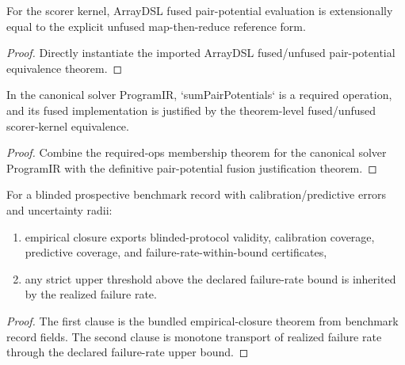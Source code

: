 \begin{theorem}
\label{thm:definitive-pair-potential-fusion-justified}
For the scorer kernel, ArrayDSL fused pair-potential evaluation is extensionally equal to the explicit unfused map-then-reduce reference form.
\end{theorem}

\begin{proof}
Directly instantiate the imported ArrayDSL fused/unfused pair-potential equivalence theorem.
\end{proof}

\begin{theorem}
\label{thm:definitive-canonical-scorer-op-label-fusion-sound}
In the canonical solver ProgramIR, `sumPairPotentials` is a required operation, and its fused implementation is justified by the theorem-level fused/unfused scorer-kernel equivalence.
\end{theorem}

\begin{proof}
Combine the required-ops membership theorem for the canonical solver ProgramIR with the definitive pair-potential fusion justification theorem.
\end{proof}

\begin{theorem}\label{thm:prospective-empirical-closure}
For a blinded prospective benchmark record with calibration/predictive errors and uncertainty radii:
\begin{enumerate}
\item empirical closure exports blinded-protocol validity, calibration coverage, predictive coverage, and failure-rate-within-bound certificates,
\item any strict upper threshold above the declared failure-rate bound is inherited by the realized failure rate.
\end{enumerate}
\end{theorem}

\begin{proof}
The first clause is the bundled empirical-closure theorem from benchmark record fields. The second clause is monotone transport of realized failure rate through the declared failure-rate upper bound.
\end{proof}

